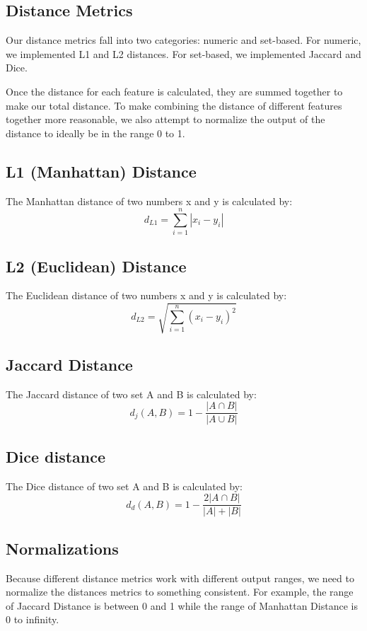 \documentclass{article}
\begin{document}
   \subsection{Distance Metrics}
      Our distance metrics fall into two categories: numeric and set-based.
      For numeric, we implemented L1 and L2 distances.
      For set-based, we implemented Jaccard and Dice.

      Once the distance for each feature is calculated, they are summed together to make our total distance.
      To make combining the distance of different features together more reasonable, we also attempt to normalize the output of the distance to ideally be in the range 0 to 1.

      \subsection{L1 (Manhattan) Distance}
         The Manhattan distance of two numbers x and y is calculated by:
         $$ d_{L1} = \sum_{i = 1}^{n} | x_{i} - y_{i} | $$

      \subsection{L2 (Euclidean) Distance}
         The Euclidean distance of two numbers x and y is calculated by:
         $$ d_{L2} = \sqrt{\sum_{i = 1}^{n}(x_{i} - y_{i})^2} $$

      \subsection{Jaccard Distance}
         The Jaccard distance of two set A and B is calculated by:
         $$ d_{j}(A, B) = 1 - \frac{| A \cap B |}{| A \cup B |}$$

      \subsection{Dice distance}
         The Dice distance of two set A and B is calculated by:
         $$d_{d}(A, B) = 1 - \frac{2 | A \cap B |}{|A| + |B|} $$

   \subsection{Normalizations}
      Because different distance metrics work with different output ranges, we need to normalize the distances metrics to something consistent.
      For example, the range of Jaccard Distance is between 0 and 1 while the range of Manhattan Distance is 0 to infinity.
\end{document}
